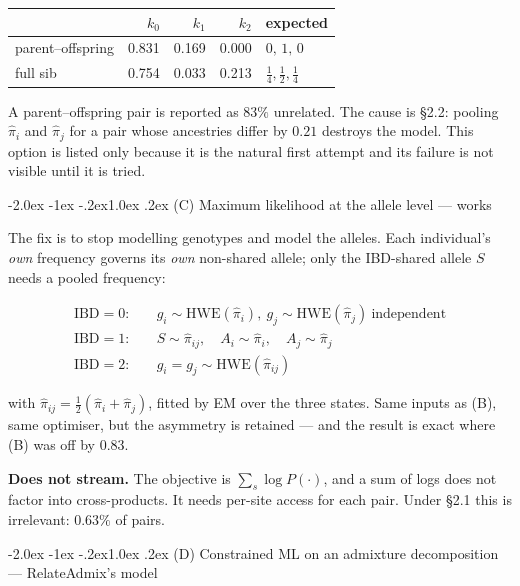 \documentclass[10pt,a4paper]{article}
\makeatletter
\renewcommand\subsection{\@startsection{subsection}{2}{\z@}%
  {-2.0ex \@plus -1ex \@minus -.2ex}{1.0ex \@plus.2ex}%
  {\normalfont\normalsize\bfseries\color{hdr}}}
\makeatother
\begin{document}
\begin{center}
\small
\begin{tabular}{@{}lrrrl@{}}
\toprule
 & $k_0$ & $k_1$ & $k_2$ & expected \\
\midrule
parent--offspring & 0.831 & 0.169 & 0.000 & $0,\,1,\,0$ \\
full sib          & 0.754 & 0.033 & 0.213 & $\tfrac14,\tfrac12,\tfrac14$ \\
\bottomrule
\end{tabular}
\end{center}

\noindent
A parent--offspring pair is reported as $83\%$ unrelated. The cause is \S2.2: pooling $\hat\pi_i$ and
$\hat\pi_j$ for a pair whose ancestries differ by $0.21$ destroys the model. This option is listed only
because it is the natural first attempt and its failure is not visible until it is tried.

\subsection{(C) Maximum likelihood at the allele level --- works}

The fix is to stop modelling genotypes and model the alleles. Each individual's \emph{own} frequency governs
its \emph{own} non-shared allele; only the IBD-shared allele $S$ needs a pooled frequency:

\begin{align*}
\text{IBD}=0:&\quad g_i\sim\mathrm{HWE}(\hat\pi_i),\ g_j\sim\mathrm{HWE}(\hat\pi_j)\ \text{independent}\\
\text{IBD}=1:&\quad S\sim\hat\pi_{ij},\quad A_i\sim\hat\pi_i,\quad A_j\sim\hat\pi_j\\
\text{IBD}=2:&\quad g_i=g_j\sim\mathrm{HWE}(\hat\pi_{ij})
\end{align*}

with $\hat\pi_{ij}=\tfrac12(\hat\pi_i+\hat\pi_j)$, fitted by EM over the three states. Same inputs as (B),
same optimiser, but the asymmetry is retained --- and the result is exact where (B) was off by $0.83$.

\textbf{Does not stream.} The objective is $\sum_s\log P(\cdot)$, and a sum of logs does not factor into
cross-products. It needs per-site access for each pair. Under \S2.1 this is irrelevant: $0.63\%$ of pairs.

\subsection{(D) Constrained ML on an admixture decomposition --- RelateAdmix's model}
\end{document}
